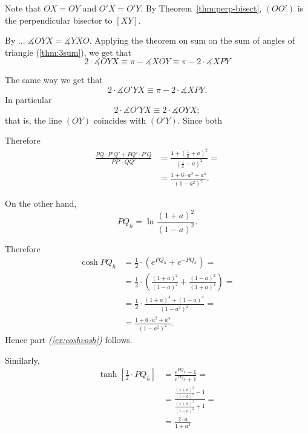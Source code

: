 
Note that $OX=OY$ and $O'X=O'Y$.
By Theorem~\ref{thm:perp-bisect},
$(OO')$ is the perpendicular bisector to $[XY]$.

By ... $\measuredangle OYX=\measuredangle YXO$.
Applying the theorem on sum on the sum of angles of triangle (\ref{thm:3sum}), we get that 
\[2\cdot \measuredangle OYX\equiv\pi -\measuredangle X O Y\equiv \pi -2\cdot\measuredangle X P Y\]

The same way we get that 
\[2\cdot \measuredangle O'YX\equiv \pi -2\cdot\measuredangle X P Y.\]
In particular 
\[2\cdot \measuredangle O'YX\equiv2\cdot \measuredangle OYX;\]
that is, the line $(OY)$ coincides with $(O'Y)$.
Since both 





















Therefore
\begin{align*}
\frac{PQ\cdot  P'Q'+PQ'\cdot  P'Q}{PP'\cdot QQ'}
&=\frac{4+(\tfrac1a+a)^2}{(\tfrac1a-a)^2}=
\\
&=\frac{1+ 6\cdot a^2+a^4}{(1-a^2)^2}.
\end{align*}

On the other hand,
\[PQ_h=\ln \frac{(1+a)^2}{(1-a)^2}.\]

Therefore 
\begin{align*}\cosh PQ_h &=\tfrac12\cdot\left(e^{PQ_h}+e^{-PQ_h}\right)=
\\
&=\tfrac12\cdot\left(\frac{(1+a)^2}{(1-a)^2}+\frac{(1-a)^2}{(1+a)^2}\right)=
\\
&=\tfrac12\cdot\frac{(1+a)^4+(1-a)^4}{(1-a^2)^2}=
\\
&=\frac{1+6\cdot a^2 +a^4}{(1-a^2)^2}.
\end{align*}
Hence part \textit{(\ref{ex:coshcosh})} follows.

Similarly,
\begin{align*}
\tanh[\tfrac12\cdot PQ_h] &=\frac{e^{PQ_h}-1}{e^{PQ_h}+1}=
\\
&=\frac{\frac{(1+a)^2}{(1-a)^2}-1}{\frac{(1+a)^2}{(1-a)^2}+1}=
\\
&=\frac{2\cdot a}{1+a^2}
\end{align*}

